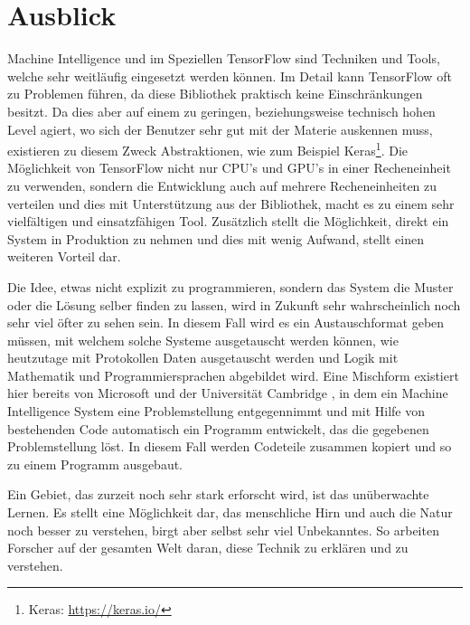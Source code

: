 
\section{Ausblick}

\noindent
Machine Intelligence und im Speziellen TensorFlow sind Techniken und Tools, welche sehr weitläufig eingesetzt werden können. 
Im Detail kann TensorFlow oft zu Problemen führen, da diese Bibliothek praktisch keine Einschränkungen besitzt. 
Da dies aber auf einem zu geringen, beziehungsweise technisch hohen Level agiert, wo sich der Benutzer sehr gut mit der Materie auskennen muss, existieren zu diesem Zweck Abstraktionen, wie zum Beispiel Keras\footnote{Keras: \url{https://keras.io/}}. 
Die Möglichkeit von TensorFlow nicht nur CPU's und GPU's in einer Recheneinheit zu verwenden, sondern die Entwicklung auch auf mehrere Recheneinheiten zu verteilen und dies mit Unterstützung aus der Bibliothek, macht es zu einem sehr vielfältigen und einsatzfähigen Tool. 
Zusätzlich stellt die Möglichkeit, direkt ein System in Produktion zu nehmen und dies mit wenig Aufwand, stellt einen weiteren Vorteil dar. \newline

\noindent
Die Idee, etwas nicht explizit zu programmieren, sondern das System die Muster oder die Lösung selber finden zu lassen, wird in Zukunft sehr wahrscheinlich noch sehr viel öfter zu sehen sein. 
In diesem Fall wird es ein Austauschformat geben müssen, mit welchem solche Systeme ausgetauscht werden können, wie heutzutage mit Protokollen Daten ausgetauscht werden und Logik mit Mathematik und Programmiersprachen abgebildet wird. 
Eine Mischform existiert hier bereits von Microsoft und der Universität Cambridge \cite{deepcoder-learning-write-programs}, in dem ein Machine Intelligence System eine Problemstellung entgegennimmt und mit Hilfe von bestehenden Code automatisch ein Programm entwickelt, das die gegebenen Problemstellung löst. 
In diesem Fall werden Codeteile zusammen kopiert und so zu einem Programm ausgebaut. \newline

\noindent
Ein Gebiet, das zurzeit noch sehr stark erforscht wird, ist das unüberwachte Lernen. 
Es stellt eine Möglichkeit dar, das menschliche Hirn und auch die Natur noch besser zu verstehen, birgt aber selbst sehr viel Unbekanntes. 
So arbeiten Forscher auf der gesamten Welt daran, diese Technik zu erklären und zu verstehen. 







